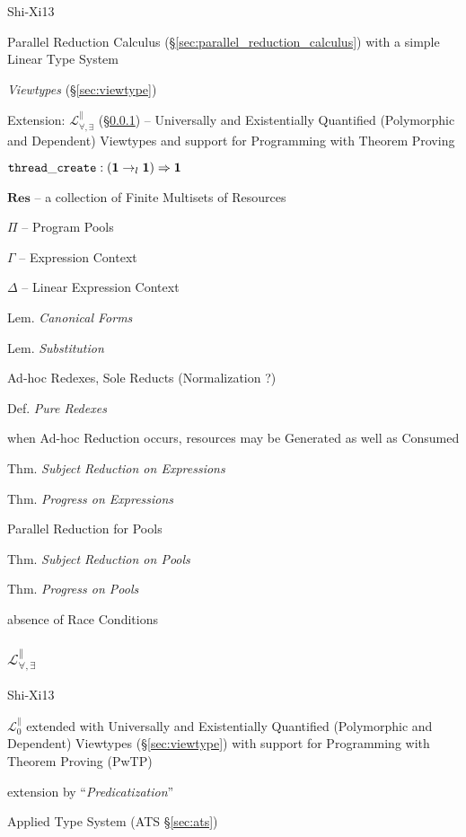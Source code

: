 Shi-Xi13

Parallel Reduction Calculus (\S\ref{sec:parallel_reduction_calculus})
with a simple Linear Type System

\emph{Viewtypes} (\S\ref{sec:viewtype})

\fist Extension: $\mathcal{L}^\parallel_{\forall,\exists}$
(\S\ref{sec:l_par_quant}) -- Universally and Existentially Quantified
(Polymorphic and Dependent) Viewtypes and support for Programming with
Theorem Proving

$\mathtt{thread\_create} : (\mathbf{1} \rightarrow_l \mathbf{1})
\Rightarrow \mathbf{1}$

$\mathbf{Res}$ -- a collection of Finite Multisets of Resources

$\Pi$ -- Program Pools

$\Gamma$ -- Expression Context

$\Delta$ -- Linear Expression Context

Lem. \emph{Canonical Forms}

Lem. \emph{Substitution}

Ad-hoc Redexes, Sole Reducts (Normalization ?)

Def. \emph{Pure Redexes}

when Ad-hoc Reduction occurs, resources may be Generated as well as
Consumed

Thm. \emph{Subject Reduction on Expressions}

Thm. \emph{Progress on Expressions}

Parallel Reduction for Pools

Thm. \emph{Subject Reduction on Pools}

Thm. \emph{Progress on Pools}

absence of Race Conditions



\subsubsection{$\mathcal{L}^\parallel_{\forall,\exists}$}
\label{sec:l_par_quant}

Shi-Xi13

$\mathcal{L}^\parallel_0$ extended with Universally and Existentially
Quantified (Polymorphic and Dependent) Viewtypes
(\S\ref{sec:viewtype}) with support for Programming with Theorem
Proving (PwTP)

extension by ``\emph{Predicatization}''

Applied Type System (ATS \S\ref{sec:ats})

